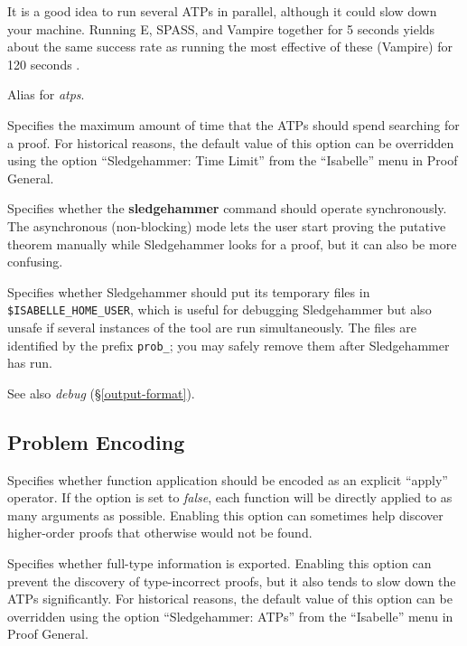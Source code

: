 \documentclass[a4paper,12pt]{article}
\begin{document}
\begin{enum}
It is a good idea to run several ATPs in parallel, although it could slow down
your machine. Running E, SPASS, and Vampire together for 5 seconds yields about
the same success rate as running the most effective of these (Vampire) for 120
seconds \cite{boehme-nipkow-2010}.

Alias for \textit{atps}.

Specifies the maximum amount of time that the ATPs should spend searching for a
proof. For historical reasons, the default value of this option can be
overridden using the option ``Sledgehammer: Time Limit'' from the ``Isabelle''
menu in Proof General.

Specifies whether the \textbf{sledgehammer} command should operate
synchronously. The asynchronous (non-blocking) mode lets the user start proving
the putative theorem manually while Sledgehammer looks for a proof, but it can
also be more confusing.

Specifies whether Sledgehammer should put its temporary files in
\texttt{\$ISA\-BELLE\_\allowbreak HOME\_\allowbreak USER}, which is useful for
debugging Sledgehammer but also unsafe if several instances of the tool are run
simultaneously. The files are identified by the prefix \texttt{prob\_}; you may
safely remove them after Sledgehammer has run.

\nopagebreak
{\small See also \textit{debug} (\S\ref{output-format}).}
\end{enum}

\subsection{Problem Encoding}
\label{problem-encoding}

\begin{enum}
Specifies whether function application should be encoded as an explicit
``apply'' operator. If the option is set to \textit{false}, each function will
be directly applied to as many arguments as possible. Enabling this option can
sometimes help discover higher-order proofs that otherwise would not be found.

Specifies whether full-type information is exported. Enabling this option can
prevent the discovery of type-incorrect proofs, but it also tends to slow down
the ATPs significantly. For historical reasons, the default value of this option
can be overridden using the option ``Sledgehammer: ATPs'' from the ``Isabelle''
menu in Proof General.
\end{enum}
\end{document}
